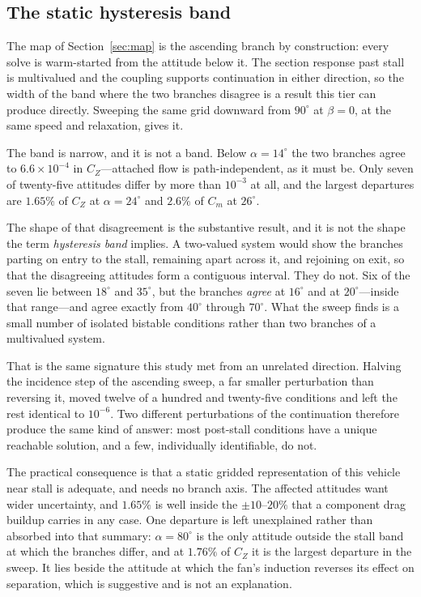 \documentclass[submit]{aiaa-tc}
\begin{document}
\subsection{The static hysteresis band}
\label{sec:hysteresis}

The map of Section~\ref{sec:map} is the ascending branch by construction:
every solve is warm-started from the attitude below it. The section
response past stall is multivalued and the coupling supports continuation
in either direction, so the width of the band where the two branches
disagree is a result this tier can produce directly. Sweeping the same
grid downward from $90^\circ$ at $\beta = 0$, at the same speed and
relaxation, gives it.

The band is narrow, and it is not a band. Below $\alpha = 14^\circ$ the
two branches agree to $6.6 \times 10^{-4}$ in $C_Z$---attached flow is
path-independent, as it must be. Only seven of twenty-five attitudes
differ by more than $10^{-3}$ at all, and the largest departures are
$1.65\%$ of $C_Z$ at $\alpha = 24^\circ$ and $2.6\%$ of $C_m$ at
$26^\circ$.

The shape of that disagreement is the substantive result, and it is not
the shape the term \emph{hysteresis band} implies. A two-valued system
would show the branches parting on entry to the stall, remaining apart
across it, and rejoining on exit, so that the disagreeing attitudes form a
contiguous interval. They do not. Six of the seven lie between $18^\circ$
and $35^\circ$, but the branches \emph{agree} at $16^\circ$ and at
$20^\circ$---inside that range---and agree exactly from $40^\circ$ through
$70^\circ$. What the sweep finds is a small number of isolated bistable
conditions rather than two branches of a multivalued system.

That is the same signature this study met from an unrelated direction.
Halving the incidence step of the ascending sweep, a far smaller
perturbation than reversing it, moved twelve of a hundred and twenty-five
conditions and left the rest identical to $10^{-6}$. Two different
perturbations of the continuation therefore produce the same kind of
answer: most post-stall conditions have a unique reachable solution, and a
few, individually identifiable, do not.

The practical consequence is that a static gridded representation of this
vehicle near stall is adequate, and needs no branch axis. The affected
attitudes want wider uncertainty, and $1.65\%$ is well inside the
$\pm10$--$20\%$ that a component drag buildup carries in any case. One
departure is left unexplained rather than absorbed into that summary:
$\alpha = 80^\circ$ is the only attitude outside the stall band at which
the branches differ, and at $1.76\%$ of $C_Z$ it is the largest departure
in the sweep. It lies beside the attitude at which the fan's induction
reverses its effect on separation, which is suggestive and is not an
explanation.
\end{document}
